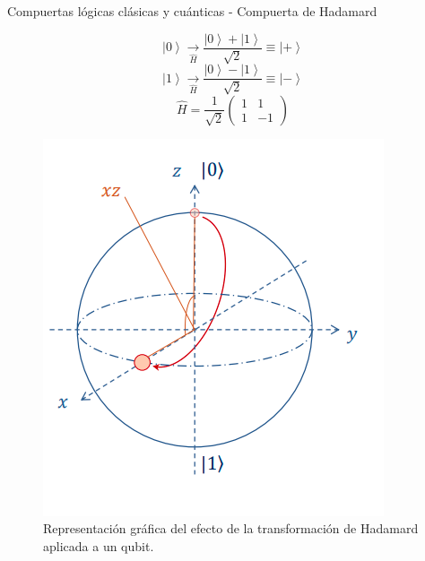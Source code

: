 \begin{frame}{Compuertas lógicas clásicas y cuánticas - Compuerta de Hadamard}
\begin{minipage}{0.49\linewidth}
   \begin{equation*}
    \left| 0 \right\rangle \underset{\hat{H}}{\rightarrow} \frac{\left| 0 \right\rangle+\left| 1\right\rangle }{\sqrt{2}} \equiv \left| + \right\rangle
    \end{equation*}
    \begin{equation*}
      \left| 1 \right\rangle \underset{\hat{H}}{\rightarrow} \frac{\left| 0 \right\rangle-\left| 1\right\rangle }{\sqrt{2}} \equiv \left| - \right\rangle  
    \end{equation*}
    \begin{equation*}
        \hat{H} = \frac{1}{\sqrt{2}} \left(\begin{matrix}
            1 & 1 \\
            1 & -1
        \end{matrix} \right)
    \end{equation*}
\end{minipage} 
\begin{minipage}{0.49\linewidth}
    \begin{figure}[H]
        \centering
        \includegraphics[scale=0.3]{images/hadamard.png}
        \caption{Representación gráfica del efecto de la transformación de Hadamard aplicada a un qubit.} 
    \end{figure}
\end{minipage} 
\end{frame}
